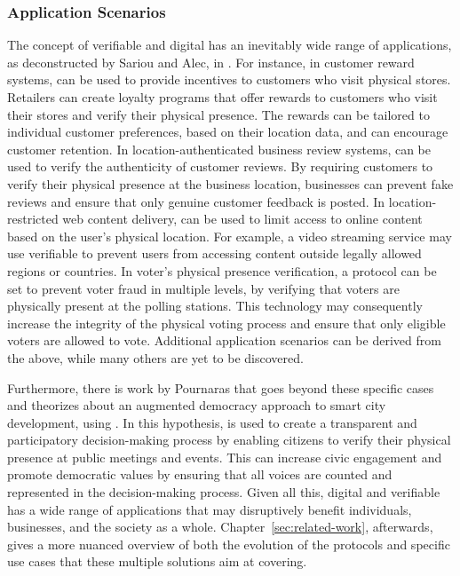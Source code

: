 \subsubsection{Application Scenarios}

The concept of verifiable and digital \pol{} has an inevitably wide range of applications, as deconstructed by Sariou and Alec, in \cite{saroiu2009enabling}. For instance, in customer reward systems, \pol{} can be used to provide incentives to customers who visit physical stores. Retailers can create loyalty programs that offer rewards to customers who visit their stores and verify their physical presence. The rewards can be tailored to individual customer preferences, based on their location data, and can encourage customer retention. In location-authenticated business review systems, \pol{} can be used to verify the authenticity of customer reviews. By requiring customers to verify their physical presence at the business location, businesses can prevent fake reviews and ensure that only genuine customer feedback is posted. In location-restricted web content delivery, \pol{} can be used to limit access to online content based on the user's physical location. For example, a video streaming service may use verifiable \pol{} to prevent users from accessing content outside legally allowed regions or countries. In voter's physical presence verification, a \pol{} protocol can be set to prevent voter fraud in multiple levels, by verifying that voters are physically present at the polling stations. This technology may consequently increase the integrity of the physical voting process and ensure that only eligible voters are allowed to vote. Additional application scenarios can be derived from the above, while many others are yet to be discovered.

Furthermore, there is work by Pournaras \cite{pournaras2020proof} that goes beyond these specific cases and theorizes about an augmented democracy approach to smart city development, using \pol{}. In this hypothesis, \pol{} is used to create a transparent and participatory decision-making process by enabling citizens to verify their physical presence at public meetings and events. This can increase civic engagement and promote democratic values by ensuring that all voices are counted and represented in the decision-making process. Given all this, digital and verifiable \pol{} has a wide range of applications that may disruptively benefit individuals, businesses, and the society as a whole. Chapter~\ref{sec:related-work}, afterwards, gives a more nuanced overview of both the evolution of the protocols and specific use cases that these multiple solutions aim at covering.